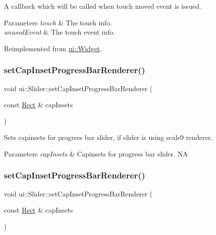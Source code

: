 A callback which will be called when touch moved event is issued. 
\begin{DoxyParams}{Parameters}
{\em touch} & The touch info. \\
\hline
{\em unused\+Event} & The touch event info. \\
\hline
\end{DoxyParams}


Reimplemented from \hyperlink{classui_1_1Widget_a16e6247b1c43273eac77623e8f129dd4}{ui\+::\+Widget}.

\mbox{\label{classui_1_1Slider_a842f741bea3f683a5d045cd46e457d36}} 
\subsubsection{\texorpdfstring{set\+Cap\+Inset\+Progress\+Bar\+Renderer()}{setCapInsetProgressBarRenderer()}\hspace{0.1cm}{\footnotesize\ttfamily [1/2]}}
{\footnotesize\ttfamily void ui\+::\+Slider\+::set\+Cap\+Inset\+Progress\+Bar\+Renderer (\begin{DoxyParamCaption}\item[{const \hyperlink{classRect}{Rect} \&}]{cap\+Insets }\end{DoxyParamCaption})}

Sets capinsets for progress bar slider, if slider is using scale9 renderer. 
\begin{DoxyParams}{Parameters}
{\em cap\+Insets} & Capinsets for progress bar slider.  NA \\
\hline
\end{DoxyParams}
\mbox{\label{classui_1_1Slider_a842f741bea3f683a5d045cd46e457d36}} 
\subsubsection{\texorpdfstring{set\+Cap\+Inset\+Progress\+Bar\+Renderer()}{setCapInsetProgressBarRenderer()}\hspace{0.1cm}{\footnotesize\ttfamily [2/2]}}
{\footnotesize\ttfamily void ui\+::\+Slider\+::set\+Cap\+Inset\+Progress\+Bar\+Renderer (\begin{DoxyParamCaption}\item[{const \hyperlink{classRect}{Rect} \&}]{cap\+Insets }\end{DoxyParamCaption})}

